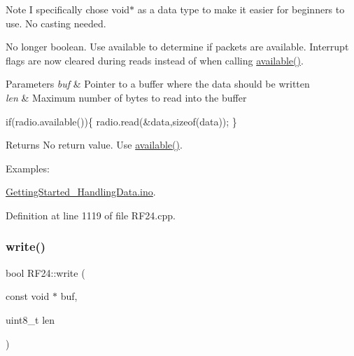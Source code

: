 \begin{DoxyNote}{Note}
I specifically chose \textquotesingle{}void$\ast$\textquotesingle{} as a data type to make it easier for beginners to use. No casting needed.

No longer boolean. Use available to determine if packets are available. Interrupt flags are now cleared during reads instead of when calling \hyperlink{classRF24_a127105eb7a3b351cfe777c1cec50627a}{available()}.
\end{DoxyNote}

\begin{DoxyParams}{Parameters}
{\em buf} & Pointer to a buffer where the data should be written \\
\hline
{\em len} & Maximum number of bytes to read into the buffer\\
\hline
\end{DoxyParams}

\begin{DoxyCode}
\textcolor{keywordflow}{if}(radio.available())\{
  radio.read(&data,\textcolor{keyword}{sizeof}(data));
\}
\end{DoxyCode}
 \begin{DoxyReturn}{Returns}
No return value. Use \hyperlink{classRF24_a127105eb7a3b351cfe777c1cec50627a}{available()}. 
\end{DoxyReturn}
\begin{Desc}
\item[Examples\+: ]\par
\hyperlink{GettingStarted_HandlingData_8ino-example}{Getting\+Started\+\_\+\+Handling\+Data.\+ino}.\end{Desc}


Definition at line 1119 of file R\+F24.\+cpp.

\mbox{\label{classRF24_a4cd4c198a47704db20b6b5cf0731cd58}} 
\subsubsection{\texorpdfstring{write()}{write()}\hspace{0.1cm}{\footnotesize\ttfamily [1/2]}}
{\footnotesize\ttfamily bool R\+F24\+::write (\begin{DoxyParamCaption}\item[{const void $\ast$}]{buf,  }\item[{uint8\+\_\+t}]{len }\end{DoxyParamCaption})}

